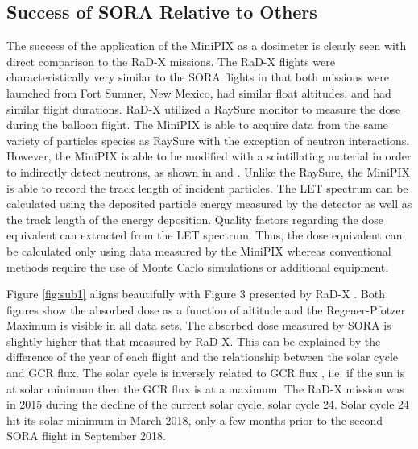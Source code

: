 %



\subsection{Success of SORA Relative to Others}

The success of the application of the MiniPIX as a dosimeter is clearly seen with direct comparison to the RaD-X missions. The RaD-X flights were characteristically very similar to the SORA flights in that both missions were launched from Fort Sumner, New Mexico, had similar float altitudes, and had similar flight durations. RaD-X utilized a RaySure monitor to measure the dose during the balloon flight. The MiniPIX is able to acquire data from the same variety of particles species as RaySure with the exception of neutron interactions. However, the MiniPIX is able to be modified with a scintillating material in order to indirectly detect neutrons, as shown in \cite{medipix-neutron-scintillator-1} and \cite{medipix-neutron-scintillator-2}. Unlike the RaySure, the MiniPIX is able to record the track length of incident particles. The LET spectrum can be calculated using the deposited particle energy measured by the detector as well as the track length of the energy deposition. Quality factors regarding the dose equivalent can extracted from the LET spectrum. Thus, the dose equivalent can be calculated only using data measured by the MiniPIX whereas conventional methods require the use of Monte Carlo simulations \cite{stuartthesis} or additional equipment.   

Figure \ref{fig:sub1} aligns beautifully with Figure 3 presented by RaD-X \cite{rad-x}. Both figures show the absorbed dose as a function of altitude and the Regener-Pfotzer Maximum is visible in all data sets. The absorbed dose measured by SORA is slightly higher that that measured by RaD-X. This can be explained by the difference of the year of each flight and the relationship between the solar cycle and GCR flux. The solar cycle is inversely related to GCR flux \cite{hathaway}, i.e. if the sun is at solar minimum then the GCR flux is at a maximum. The RaD-X mission was in 2015 during the decline of the current solar cycle, solar cycle \num{24}. Solar cycle \num{24} hit its solar minimum in March 2018, only a few months prior to the second SORA flight in September 2018. 


